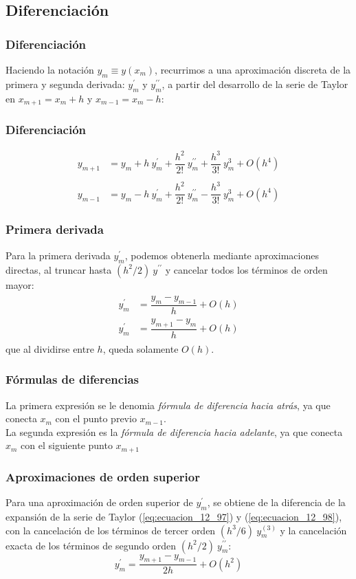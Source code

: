 \subsection{Diferenciación}
\begin{frame}
\frametitle{Diferenciación}
Haciendo la notación $y_{m} \equiv y(x_{m})$, recurrimos a una aproximación discreta de la primera y segunda derivada: $y^{\prime}_{m}$ y $y^{\prime \prime}_{m}$, a partir del desarrollo de la serie de Taylor en $x_{m + 1} = x_{m} + h$ y $x_{m - 1} = x_{m} - h$:
\end{frame}
\begin{frame}
\frametitle{Diferenciación}
\begin{align}
y_{m + 1}&= y_{m} + h \: y^{\prime}_{m} + \dfrac{h^{2}}{2!} \: y^{\prime \prime}_{m} + \dfrac{h^{3}}{3!} \: y^{3}_{m} + O(h^{4}) \label{eq:ecuacion_12_97} \\
\nonumber \\
y_{m - 1} &= y_{m} - h \: y^{\prime}_{m} + \dfrac{h^{2}}{2!} \: y^{\prime \prime}_{m} - \dfrac{h^{3}}{3!} \: y^{3}_{m} + O(h^{4}) \label{eq:ecuacion_12_98}
\end{align}
\end{frame}
\begin{frame}
\frametitle{Primera derivada}
Para la primera derivada $y^{\prime}_{m}$, podemos obtenerla mediante aproximaciones directas, al truncar hasta  $(h^{2}/2) \: y^{\prime \prime}$ y cancelar todos los términos de orden mayor:
\begin{align}
\begin{aligned}
y^{\prime}_{m} &= \dfrac{y_{m} - y_{m - 1}}{h} + O(h) \\
y^{\prime}_{m} &= \dfrac{y_{m + 1} - y_{m}}{h} + O(h)
\end{aligned}
\label{eq:ecuacion_12_99}
\end{align}
que al dividirse entre $h$, queda solamente $O(h)$.
\end{frame}
\begin{frame}
\frametitle{Fórmulas de diferencias}
La primera expresión se le denomia \emph{fórmula de diferencia hacia atrás}, ya que conecta $x_{m}$ con el punto previo $x_{m - 1}$.
\\
\bigskip
La segunda expresión es la \emph{fórmula de diferencia hacia adelante}, ya que conecta $x_{m}$ con el siguiente punto $x_{m + 1}$
\end{frame}
\begin{frame}
\frametitle{Aproximaciones de orden superior}
Para una aproximación de orden superior de $y^{\prime}_{m}$, se obtiene de la diferencia de la expansión de la serie de Taylor (\ref{eq:ecuacion_12_97}) y (\ref{eq:ecuacion_12_98}), con la cancelación de los términos de tercer orden $(h^{3}/6) \: y^{(3)}_{m}$ y la cancelación exacta de los términos de segundo orden $(h^{2}/2) \: y^{\prime \prime}_{m}$:
\begin{equation}
y^{\prime}_{m} = \dfrac{y_{m + 1} -  y_{m - 1}}{2h} + O(h^{2})
\label{eq:ecuacion_12_100}
\end{equation}
\end{frame}
